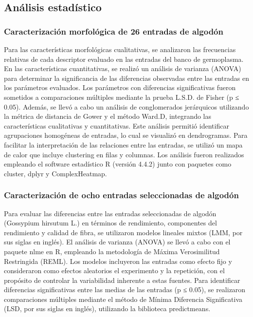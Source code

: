 \documentclass[12pt,oneside]{reedthesis}
\begin{document}
\subsection{Análisis estadístico}\label{anuxe1lisis-estaduxedstico}

\subsubsection{Caracterización morfológica de 26 entradas de algodón}\label{caracterizaciuxf3n-morfoluxf3gica-de-26-entradas-de-algoduxf3n}

Para las características morfológicas cualitativas, se analizaron las frecuencias relativas de cada descriptor evaluado en las entradas del banco de germoplasma. En las características cuantitativas, se realizó un análisis de varianza (ANOVA) para determinar la significancia de las diferencias observadas entre las entradas en los parámetros evaluados. Los parámetros con diferencias significativas fueron sometidos a comparaciones múltiples mediante la prueba L.S.D. de Fisher (p ≤ 0.05). Además, se llevó a cabo un análisis de conglomerados jerárquicos utilizando la métrica de distancia de Gower y el método Ward.D, integrando las características cualitativas y cuantitativas. Este análisis permitió identificar agrupaciones homogéneas de entradas, lo cual se visualizó en dendrogramas. Para facilitar la interpretación de las relaciones entre las entradas, se utilizó un mapa de calor que incluye clustering en filas y columnas. Los análisis fueron realizados empleando el software estadístico R (versión 4.4.2) junto con paquetes como cluster, dplyr y ComplexHeatmap.

\subsubsection{Caracterización de ocho entradas seleccionadas de algodón}\label{caracterizaciuxf3n-de-ocho-entradas-seleccionadas-de-algoduxf3n}

Para evaluar las diferencias entre las entradas seleccionadas de algodón (Gossypium hirsutum L.) en términos de rendimiento, componentes del rendimiento y calidad de fibra, se utilizaron modelos lineales mixtos (LMM, por sus siglas en inglés). El análisis de varianza (ANOVA) se llevó a cabo con el paquete nlme en R, empleando la metodología de Máxima Verosimilitud Restringida (REML). Los modelos incluyeron las entradas como efecto fijo y consideraron como efectos aleatorios el experimento y la repetición, con el propósito de controlar la variabilidad inherente a estas fuentes. Para identificar diferencias significativas entre las medias de las entradas (p ≤ 0.05), se realizaron comparaciones múltiples mediante el método de Mínima Diferencia Significativa (LSD, por sus siglas en inglés), utilizando la biblioteca predictmeans.
\end{document}
